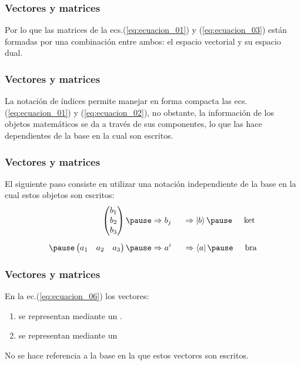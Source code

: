 \documentclass[12pt]{beamer}
\begin{document}
\begin{frame}
\frametitle{Vectores y matrices}
Por lo que las matrices de la ecs.(\ref{eq:ecuacion_01}) y (\ref{eq:ecuacion_03}) están formadas por una combinación entre ambos: el espacio vectorial y su espacio dual.
\end{frame}
\begin{frame}
\frametitle{Vectores y matrices}
La notación de índices permite manejar en forma compacta las ecs. (\ref{eq:ecuacion_01}) y (\ref{eq:ecuacion_02}), \pause no obstante, la información de los objetos matemáticos se da a través de sus componentes, lo que las hace dependientes de la base en la cual son escritos.
\end{frame}
\begin{frame}
\frametitle{Vectores y matrices}
El siguiente paso consiste en utilizar una notación independiente de la base en la cual estos objetos son escritos:
\pause
\begin{eqnarray}
\begin{aligned}
\begin{pmatrix}
b_{1} \\
b_{2} \\
b_{3}
\end{pmatrix} \pause
&\Rightarrow b_{j} \hspace{0.5cm} \Rightarrow \ket{b} \pause \hspace{0.5cm} \mbox{ket}
\\[0.5em] \pause
\begin{pmatrix}
a_{1} & a_{2} & a_{3}
\end{pmatrix} \pause 
&\Rightarrow a^{i} \hspace{0.5cm} \Rightarrow \bra{a} \pause \hspace{0.5cm} \mbox{bra}
\end{aligned}
\label{eq:ecuacion_06}
\end{eqnarray}
\end{frame}
\begin{frame}
\frametitle{Vectores y matrices}
En la ec.(\ref{eq:ecuacion_06}) los vectores:
\begin{enumerate}[<+->]
\item {} se representan mediante un .
\item {} se representan mediante un 
\end{enumerate}
\pause
No se hace referencia a la base en la que estos vectores son escritos.
\end{frame}
\end{document}
